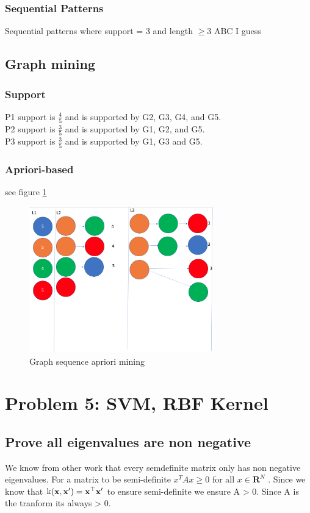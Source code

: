 \documentclass[11pt]{article}
\begin{document}
\subsubsection{Sequential Patterns}
Sequential patterns where support = 3 and length $\ge 3$
ABC I guess
\subsection{Graph mining}
\subsubsection{Support}
P1 support is $\frac{4}{5}$ and is supported by G2, G3, G4, and G5. \\
P2 support is $\frac{3}{5}$ and is supported by G1, G2, and G5. \\
P3 support is $\frac{3}{5}$ and is supported by G1, G3 and G5.
\subsubsection{Apriori-based}
see figure \ref{fig:graph-apri}
\begin{figure}[]
\centering
\includegraphics[width=8cm]{Assignments/Assignment1/graphapri.png}
\caption{Graph sequence apriori mining}
\label{fig:graph-apri}
\end{figure}
\section{Problem 5: SVM, RBF Kernel}
\subsection{Prove all eigenvalues are non negative}
We know from other work that every semdefinite matrix only has non negative eigenvalues. 
For a matrix to be semi-definite $x^TAx \ge 0$ for all $x \in \mathbf{R}^N $ . Since we know that $\text{k}(\bold{x}, \bold{x}') = \bold{x}^\top \bold{x}'$ to ensure semi-definite we ensure A > 0. Since A is the tranform its always > 0. 
\end{document}
